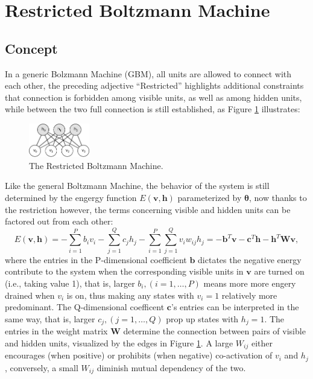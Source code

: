\documentclass[11pt]{article}
\newcommand{\vb}{\boldsymbol{b}}
\newcommand{\vc}{\boldsymbol{c}}
\newcommand{\vh}{\boldsymbol{h}}
\newcommand{\vv}{\boldsymbol{v}}
\newcommand{\mw}{\boldsymbol{W}}
\newcommand{\pEC}{\boldsymbol{\theta}}
\begin{document}
{\section{Restricted Boltzmann Machine}
\subsection{Concept}
In a generic Bolzmann Machine (GBM), all units are allowed to connect with each other, the preceding adjective ``Restricted'' highlights additional constraints that connection is forbidden among visible units, as well as among hidden units, while between the two full connection is still established, as Figure \ref{fig:rbm} illustrates:
\begin{figure}[h]
  \centering
  \includegraphics[width=100px]{img/rbm.png}
  \caption{The Restricted Boltzmann Machine.}\label{fig:rbm}
\end{figure}
Like the general Boltzmann Machine, the behavior of the system is still determined by the engergy function $E(\vv, \vh)$ parameterized by $\pEC$, now thanks to the restriction however, the terms concerning visible and hidden units can be factored out from each other:
\begin{equation} \label{eq:rbm:e(s)}
  E(\vv, \vh) = -\sum_{i=1}^{P}{b_i v_i} - \sum_{j=1}^{Q}{c_j h_j} - \sum_{i=1}^P\sum_{j=1}^Q{v_i w_{ij} h_j} = -\vb^T \vv - \vc^T \vh - \vh^T \mw \vv,
\end{equation}
where the entries in the P-dimensional coefficient $\vb$ dictates the negative energy contribute to the system when the corresponding visible units in $\vv$ are turned on (i.e., taking value 1), that is, larger $b_i, (i=1, \dots, P)$ means more more engery drained when $v_i$ is on, thus making any states with $v_i=1$ relatively more predominant. The Q-dimensional coefficent $\vc$'s entries can be interpreted in the same way, that is, larger $c_j, (j=1, \dots, Q)$ prop up states with $h_j=1$. The entries in the weight matrix $\mw$ determine the connection between pairs of visible and hidden units, visualized by the edges in Figure \ref{fig:rbm}. A large $W_{ij}$ either encourages (when positive) or prohibits (when negative) co-activation of $v_i$ and $h_j$, conversely, a small $W_{ij}$ diminish mutual dependency of the two.
}
\end{document}
